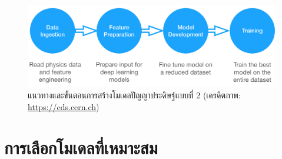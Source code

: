 \begin{figure}[H]
    \centering
    \includegraphics[width=0.8\linewidth]{fig/ml_pipeline.png}
    \caption{แนวทางและขั้นตอนการสร้างโมเดลปัญญาประดิษฐ์แบบที่ 2 (เครดิตภาพ: \url{https://cds.cern.ch})}
    \label{fig:ml_pipeline}
\end{figure}

\section{การเลือกโมเดลที่เหมาะสม}
\label{sec:choose_ml_model}

